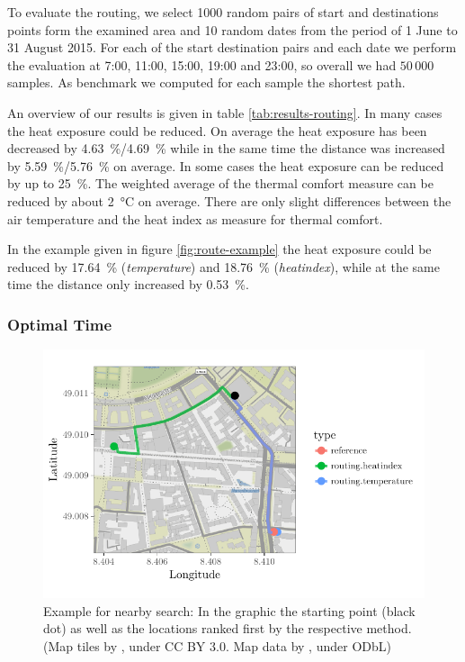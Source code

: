 To evaluate the routing, we select 1000 random pairs of start and destinations points form the examined  area and 10 random dates from the period of 1 June to 31 August 2015. For each of the start destination pairs and each date we  perform the evaluation at 7:00, 11:00, 15:00, 19:00 and 23:00, so overall we had $50\,000$ samples. As benchmark we computed for each sample the shortest path. 


An overview of our results is given in table \ref{tab:results-routing}. In many cases the heat exposure could be reduced. On average the heat exposure has been decreased by \SI{4.63}{\percent}/\SI{4.69}{\percent} while in the same time the distance was increased by  \SI{5.59}{\percent}/\SI{5.76}{\percent} on average. In some cases the heat exposure can be reduced by up to \SI{25}{\percent}. The weighted average of the thermal comfort measure can be reduced by about \SI{2}{\celsius} on average. There are only slight differences between the air temperature and the heat index as measure for thermal comfort. 

In the example given in figure \ref{fig:route-example} the heat exposure could be reduced by \SI{17.64}{\percent} (\emph{temperature}) and \SI{18.76}{\percent} (\emph{heatindex}), while at the same time the distance only increased by  \SI{0.53}{\percent}.

\subsubsection{Optimal Time}

\begin{figure}
	\centering
	\includegraphics[scale=0.9]{figures/optimaltime_route_example}
	\caption{Example for nearby search: In the graphic the starting point (black dot) as well as the locations ranked first by the respective method. (Map tiles by \textcite{Stamen2017}, under CC BY 3.0. Map data by \textcite{OSMF2016}, under ODbL)}
	\label{fig:optimaltime-route-example}
\end{figure}

